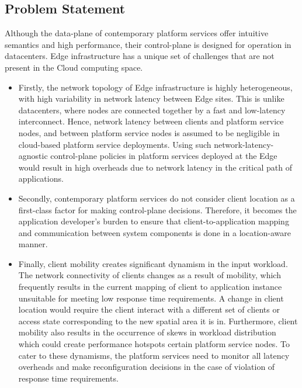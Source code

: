 \subsection{Problem Statement}

Although the data-plane of contemporary platform services offer intuitive semantics and high performance, their control-plane is designed for operation in datacenters. Edge infrastructure has a unique set of challenges that are not present in the Cloud computing space.
\begin{itemize}
    \item Firstly, the network topology of Edge infrastructure is highly heterogeneous, with high variability in network latency between Edge sites. This is unlike datacenters, where nodes are connected together by a fast and low-latency interconnect. Hence, network latency between clients and platform service nodes, and between platform service nodes is assumed to be negligible in cloud-based platform service deployments. Using such network-latency-agnostic control-plane policies in platform services deployed at the Edge would result in high overheads due to network latency in the critical path of applications.
    \item Secondly, contemporary platform services do not consider client location as a first-class factor for making control-plane decisions. Therefore, it becomes the application developer's burden to ensure that client-to-application mapping and communication between system components is done in a location-aware manner.
    \item Finally, client mobility creates significant dynamism in the input workload. The network connectivity of clients changes as a result of mobility, which frequently results in the current mapping of client to application instance unsuitable for meeting low response time requirements. A change in client location would require the client interact with a different set of clients or access state corresponding to the new spatial area it is in. Furthermore, client mobility also results in the occurrence of skews in workload distribution which could create performance hotspots certain platform service nodes. To cater to these dynamisms, the platform services need to monitor all latency overheads and make reconfiguration decisions in the case of violation of response time requirements.
\end{itemize}


